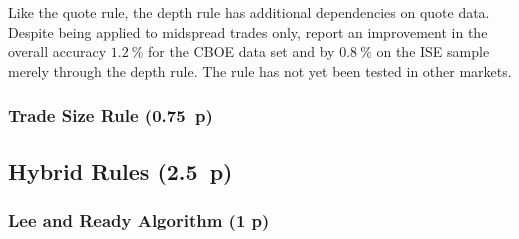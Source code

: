 Like the quote rule, the depth rule has additional dependencies on quote data. Despite being applied to midspread trades only, \textcite[][p.4]{grauerOptionTradeClassification2022} report an improvement in the overall accuracy $1.2~\%$ for the CBOE data set and by $0.8~\%$ on the ISE sample merely through the depth rule. The rule has not yet been tested in other markets.


\subsubsection{Trade Size Rule (0.75~p)}\label{sec:trade-size-rule}







\subsection{Hybrid Rules (2.5~p)}\label{sec:hybrid-rules}

\subsubsection{Lee and Ready Algorithm (1 p)}\label{sec:lee-and-ready-algorithm}



